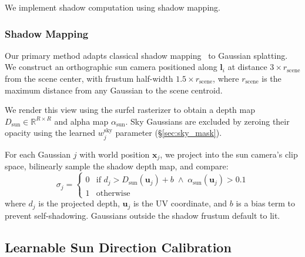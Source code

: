 \documentclass[conference]{IEEEtran}
\begin{document}
We implement shadow computation using shadow mapping.

\subsubsection{Shadow Mapping}
\label{sec:shadow_map}

Our primary method adapts classical shadow mapping~\cite{williams1978casting} to Gaussian splatting.
We construct an orthographic sun camera positioned along $\mathbf{l}_i$ at distance $3\times r_{\text{scene}}$ from the scene center, with frustum half-width $1.5\times r_{\text{scene}}$, where $r_{\text{scene}}$ is the maximum distance from any Gaussian to the scene centroid.

We render this view using the surfel rasterizer to obtain a depth map $D_{\text{sun}} \in \mathbb{R}^{R \times R}$ and alpha map $\alpha_{\text{sun}}$.
Sky Gaussians are excluded by zeroing their opacity using the learned $w_j^{\text{sky}}$ parameter (\S\ref{sec:sky_mask}).

For each Gaussian $j$ with world position $\mathbf{x}_j$, we project into the sun camera's clip space, bilinearly sample the shadow depth map, and compare:
\begin{equation}
    \sigma_j = \begin{cases}
        0 & \text{if } d_j > D_{\text{sun}}(\mathbf{u}_j) + b \;\wedge\; \alpha_{\text{sun}}(\mathbf{u}_j) > 0.1 \\
        1 & \text{otherwise}
    \end{cases}
\end{equation}
where $d_j$ is the projected depth, $\mathbf{u}_j$ is the UV coordinate, and $b$ is a bias term to prevent self-shadowing.
Gaussians outside the shadow frustum default to lit.

\subsection{Learnable Sun Direction Calibration}
\label{sec:sun_cal}
\end{document}
